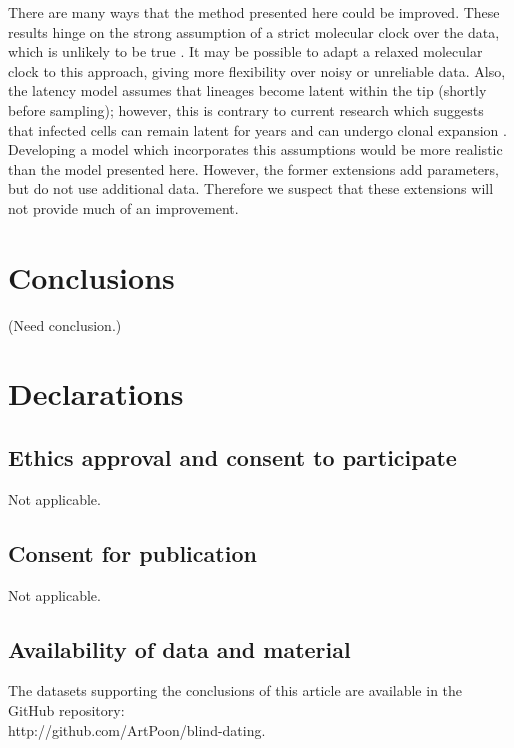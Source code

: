 \documentclass[12pt]{article}
\begin{document}
There are many ways that the method presented here could be improved.
These results hinge on the strong assumption of a strict molecular clock over the data, which is unlikely to be true \citep{Shankarappa99}. 
It may be possible to adapt a relaxed molecular clock \citep[for example, using \textit{r8s};][]{r8ts} to this approach, giving more flexibility over noisy or unreliable data.
Also, the latency model assumes that lineages become latent within the tip (shortly before sampling); however, this is contrary to current research which suggests that infected cells can remain latent for years and can undergo clonal expansion \citep{Maldarelli14}.
Developing a model which incorporates this assumptions
would be more realistic than the model presented here.
However, the former extensions add parameters, but do not use additional data.
Therefore we suspect that these extensions will not provide much of an improvement.



\section * {Conclusions} \label{sec:concl}
(Need conclusion.)

\section * {Declarations} \label{sec:decl}
\subsection*{Ethics approval and consent to participate}
Not applicable.

\subsection*{Consent for publication}
Not applicable.

\subsection*{Availability of data and material}
The datasets supporting the conclusions of this article are available in the GitHub repository: \\ \mbox{http://github.com/ArtPoon/blind-dating}.
\end{document}
